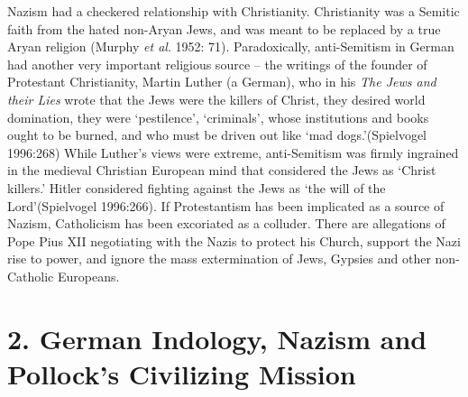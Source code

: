 Nazism had a checkered relationship with Christianity. Christianity was a Semitic faith from the hated non-Aryan Jews, and was meant to be replaced by a true Aryan religion (Murphy \textit{et al}. 1952: 71). Paradoxically, anti-Semitism in German had another very important religious source – the writings of the founder of Protestant Christianity, Martin Luther (a German), who in his \textit{The Jews and their Lies} wrote that the Jews were the killers of Christ, they desired world domination, they were ‘pestilence’, ‘criminals’, whose institutions and books ought to be burned, and who must be driven out like ‘mad dogs.’(Spielvogel 1996:268) While Luther’s views were extreme, anti-Semitism was firmly ingrained in the medieval Christian European mind that considered the Jews as ‘Christ killers.’ Hitler considered fighting against the Jews as ‘the will of the Lord’(Spielvogel 1996:266). If Protestantism has been implicated as a source of Nazism, Catholicism has been excoriated as a colluder. There are allegations of Pope Pius XII negotiating with the Nazis to protect his Church, support the Nazi rise to power, and ignore the mass extermination of Jews, Gypsies and other non-Catholic Europeans.

\vspace{-.3cm}

\section*{2. German Indology, Nazism and Pollock’s Civilizing Mission}

